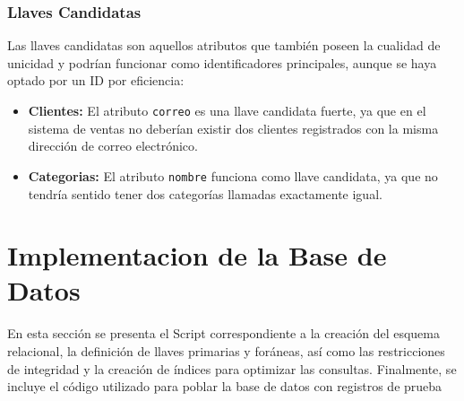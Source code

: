 \documentclass[10pt,letterpaper]{article}
\begin{document}
\subsubsection*{Llaves Candidatas}
Las llaves candidatas son aquellos atributos que también poseen la cualidad de unicidad y podrían funcionar como identificadores principales, aunque se haya optado por un ID  por eficiencia:
\begin{itemize}
    \item \textbf{Clientes:} El atributo \texttt{correo} es una llave candidata fuerte, ya que en el sistema de ventas no deberían existir dos clientes registrados con la misma dirección de correo electrónico.
    \item \textbf{Categorias:} El atributo \texttt{nombre} funciona como llave candidata, ya que no tendría sentido tener dos categorías llamadas exactamente igual.
\end{itemize}

\section{Implementacion de la Base de Datos}
En esta sección se presenta el Script correspondiente a la creación del esquema relacional, la definición de llaves primarias y foráneas,
 así como las restricciones de integridad y la creación de índices para optimizar las consultas. Finalmente, se incluye el código utilizado 
 para poblar la base de datos con registros de prueba
\end{document}
